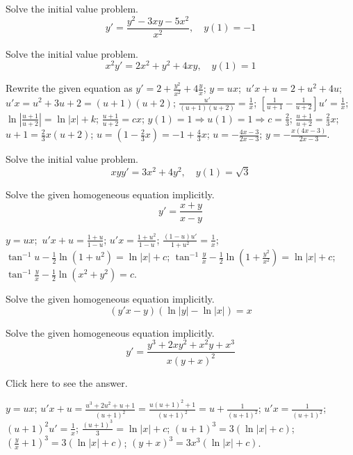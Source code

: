 \documentclass{ximera}
\begin{document}
\begin{problem}\label{exer:2.4.25} Solve the initial value problem.
$$y'=\frac{y^2-3xy-5x^2}{x^2}, \quad y(1)=-1$$
\end{problem}

\begin{problem}\label{exer:2.4.26}Solve the initial value problem.
$$x^2y'=2x^2+y^2+4xy, \quad y(1)=1$$



\begin{solution}
    Rewrite the given equation as $y'=2+\frac{y^2}{
x^2}+4\frac{y}{ x}$;\;
$y=ux$;\ $u'x+u=2+u^2+4u$;\;
$u'x=u^2+3u+2=(u+1)(u+2)$;\;
$\frac{u'}{(u+1)(u+2)}=\frac{1}{ x}$;\;
$\left[\frac{1}{ u+1}-\frac{1}{ u+2}\right]u'=\frac{1}{ x}$;\;
$\ln\left|\frac{u+1}{ u+2}\right|=\ln|x|+k$;\;
$\frac{u+1}{ u+2}=cx$;\;
$y(1)=1\Rightarrow u(1)=1\Rightarrow c=\frac{2}{3}$;\;
$\frac{u+1}{ u+2}=\frac{2}{3}x$;\;
$u+1=\frac{2}{3}x(u+2)$;\;
$u=\left(1-\frac{2}{3}x\right)=-1+\frac{4}{3}x$;\;
$u=-\frac{4x-3}{2x-3}$;\;
$y=-\frac{x(4x-3)}{2x-3}$.
\end{solution}
\end{problem}

\begin{problem}\label{exer:2.4.27} Solve the initial value problem.
$$xyy'=3x^2+4y^2, \quad y(1)=\sqrt{3}$$
\end{problem}

\begin{problem}\label{exer:2.4.28} Solve the given homogeneous equation implicitly.
$$y'=\frac{x+y}{x-y}$$



\begin{solution}
    $y=ux$;\ $u'x+u=\frac{1+u}{1-u}$;\;
$u'x=\frac{1+u^2}{1-u}$;\;
$\frac{(1-u)u'}{1+u^2}=\frac{1}{ x}$;\;
$\tan^{-1}u-\frac{1}{2}\ln(1+u^2)=\ln|x|+c$;\;
$\tan^{-1}\frac{y}{
x}-\frac{1}{2}\ln\left(1+\frac{y^2}{ x^2}\right)=\ln|x|+c$;\;
$\tan^{-1}\frac{y}{
x}-\frac{1}{2}\ln(x^2+y^2)=c$.
\end{solution}
\end{problem}

\begin{problem}\label{exer:2.4.29} Solve the given homogeneous equation implicitly.
$$(y'x-y)(\ln |y|-\ln |x|)=x$$
\end{problem}

\begin{problem}\label{exer:2.4.30} Solve the given homogeneous equation implicitly.
$$y'=\frac{y^3+2xy^2+x^2y+x^3}{x(y+x)^2}$$

Click here to see the answer.

\begin{solution}
    $y=ux$;
$u'x+u=\frac{u^3+2u^2+u+1}{(u+1)^2}=\frac{u(u+1)^2+1}{(u+1)^2}
=u+\frac{1}{(u+1)^2}$;
$u'x=\frac{1}{(u+1)^2}$;\;
$(u+1)^2u'=\frac{1}{ x}$;\;
$\frac{(u+1)^3}{3}=\ln|x|+c$;\;
$(u+1)^3=3(\ln|x|+c)$;\;
$\left(\frac{y}{ x}+1\right)^3=3(\ln|x|+c)$;\;
$(y+x)^3=3x^3(\ln|x|+c)$.
\end{solution}
\end{problem}
\end{document}
